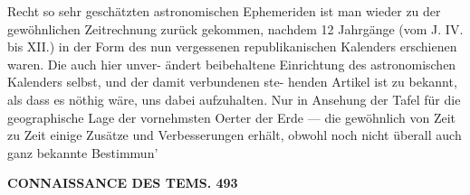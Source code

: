 \documentclass[12pt,a4paper]{article}
\begin{document}
Recht  so  sehr  geschätzten  astronomischen  Ephemeriden  ist  man wieder  zu  der  gewöhnlichen  Zeitrechnung  zurück  gekommen,  nachdem  12  Jahrgänge  (vom  J.  IV.  bis  XII.) in  der  Form  des  nun  vergessenen  republikanischen  Kalenders  erschienen  waren.  Die  auch  hier  unver- ändert beibehaltene  Einrichtung  des  astronomischen  Kalenders  selbst,  und  der  damit  verbundenen  ste- henden Artikel  ist  zu  bekannt,  als  dass  es  nöthig  wäre,  uns  dabei  aufzuhalten.  Nur  in  Ansehung  der Tafel  für  die  geographische  Lage  der  vornehmsten  Oerter  der  Erde  ---  die  gewöhnlich  von  Zeit  zu  Zeit einige  Zusätze  und  Verbesserungen  erhält,  obwohl  noch  nicht  überall  auch   ganz   bekannte  Bestimmun'

\vspace{0.5em}


\noindent\textbf{CONNAISSANCE  DES  TEMS.  493}
\end{document}
